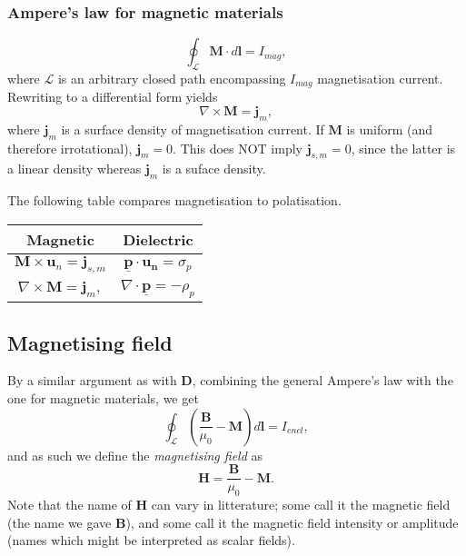 \documentclass[a4paper, 12pt]{article}
\renewcommand{\vec}[1]{\mathbf{#1}}
\newcommand{\p}{\ensuremath{\vec{\underline{p}}}}
\newcommand{\D}{\ensuremath{\vec{D}}}
\renewcommand{\j}{\ensuremath{\vec{j}}}
\newcommand{\B}{\ensuremath{\vec{B}}}
\renewcommand{\H}{\ensuremath{\vec{H}}}
\begin{document}
        \subsubsection{Ampere's law for magnetic materials}
            \begin{equation}
                \oint_\mathcal{L}\vec{M}\cdot d\vec{l} = I_{mag},
            \end{equation}
            where $\mathcal{L}$ is an arbitrary closed path encompassing $I_{mag}$ magnetisation current. 
            Rewriting to a differential form yields
            \begin{equation}
                \nabla \times \vec{M} = \j_m,
            \end{equation}
            where $\j_m$ is a surface density of magnetisation current. 
            If $\vec{M}$ is uniform (and therefore irrotational), $\j_m = 0$. 
            This does NOT imply $\j_{s, m} = 0$, since the latter is a linear density whereas $\j_m$ is a suface density.

            The following table compares magnetisation to polatisation.
            \begin{center}
                \begin{tabular}{ c|c } 
                Magnetic & Dielectric \\
                \hline
                 $\vec{M}\times\vec{u}_n = \j_{s, m}$ & $\p \cdot \vec{u_n} = \sigma_p$ \\[6px] 
                 $\nabla \times \vec{M} = \j_m,$ & $\nabla \cdot \p = -\rho_p$
                \end{tabular}
            \end{center}

    \subsection{Magnetising field}
        By a similar argument as with \D, combining the general Ampere's law with the one for magnetic materials, we get
        \begin{equation*}
            \oint_\mathcal{L}\left(\frac{\B}{\mu_0}-\vec{M}\right)d\vec{l} = I_{encl},
        \end{equation*}
        and as such we define the \textit{magnetising field} as 
        \begin{equation}
            \H = \frac{\B}{\mu_0}-\vec{M}.
        \end{equation}
        Note that the name of \H{} can vary in litterature; some call it the magnetic field 
        (the name we gave \B), and some call it the magnetic field intensity or amplitude 
        (names which might be interpreted as scalar fields).
\end{document}
